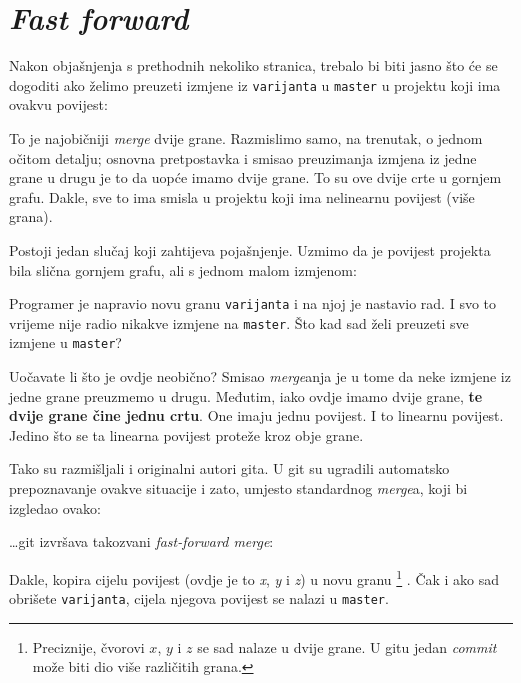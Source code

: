 \section*{\emph{Fast forward}}

Nakon objašnjenja s prethodnih nekoliko stranica, trebalo bi biti jasno što će se dogoditi ako želimo preuzeti izmjene iz \verb+varijanta+ u \verb+master+ u projektu koji ima ovakvu povijest:



To je najobičniji \emph{merge} dvije grane.
Razmislimo samo, na trenutak, o jednom očitom detalju;
osnovna pretpostavka i smisao preuzimanja izmjena iz jedne grane u drugu je to da uopće imamo dvije grane.
To su ove dvije crte u gornjem grafu.
Dakle, sve to ima smisla u projektu koji ima nelinearnu povijest (više grana).

Postoji jedan slučaj koji zahtijeva pojašnjenje.
Uzmimo da je povijest projekta bila slična gornjem grafu, ali s jednom malom izmjenom:



Programer je napravio novu granu \verb+varijanta+ i na njoj je nastavio rad.
I svo to vrijeme nije radio nikakve izmjene na \verb+master+.
Što kad sad želi preuzeti sve izmjene u \verb+master+?

Uočavate li što je ovdje neobično?
Smisao \emph{merge}anja je u tome da neke izmjene iz jedne grane preuzmemo u drugu.
Međutim, iako ovdje imamo dvije grane, \textbf{te dvije grane čine jednu crtu}. 
One imaju jednu povijest. 
I to linearnu povijest.
Jedino što se ta linearna povijest proteže kroz obje grane.

Tako su razmišljali i originalni autori gita.
U git su ugradili automatsko prepoznavanje ovakve situacije i zato, umjesto standardnog \emph{merge}a, koji bi izgledao ovako:



\dots{}git izvršava takozvani \emph{fast-forward merge}:



Dakle, kopira cijelu povijest (ovdje je to \emph x, \emph y i \emph z) u novu granu%
\footnote{Preciznije, čvorovi $x$, $y$ i $z$ se sad nalaze u dvije grane. U gitu jedan \emph{commit} može biti dio više različitih grana.}%
.
Čak i ako sad obrišete \verb+varijanta+, cijela njegova povijest se nalazi u \verb+master+.

